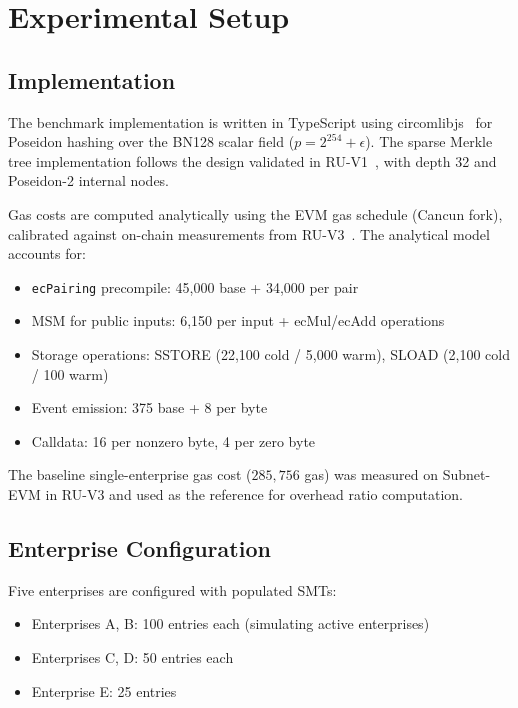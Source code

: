 
\section{Experimental Setup}

\subsection{Implementation}

The benchmark implementation is written in TypeScript using
circomlibjs~\cite{circomlibjs2024} for Poseidon hashing over the BN128 scalar
field ($p = 2^{254} + \epsilon$). The sparse Merkle tree implementation follows
the design validated in RU-V1~\cite{ruv1smt}, with depth 32 and Poseidon-2
internal nodes.

Gas costs are computed analytically using the EVM gas schedule (Cancun fork),
calibrated against on-chain measurements from RU-V3~\cite{ruv3gas}. The
analytical model accounts for:
\begin{itemize}
\item \texttt{ecPairing} precompile: 45,000 base + 34,000 per pair
\item MSM for public inputs: 6,150 per input + ecMul/ecAdd operations
\item Storage operations: SSTORE (22,100 cold / 5,000 warm), SLOAD (2,100
  cold / 100 warm)
\item Event emission: 375 base + 8 per byte
\item Calldata: 16 per nonzero byte, 4 per zero byte
\end{itemize}

The baseline single-enterprise gas cost ($285{,}756$ gas) was measured on
Subnet-EVM in RU-V3 and used as the reference for overhead ratio computation.

\subsection{Enterprise Configuration}

Five enterprises are configured with populated SMTs:
\begin{itemize}
\item Enterprises A, B: 100 entries each (simulating active enterprises)
\item Enterprises C, D: 50 entries each
\item Enterprise E: 25 entries
\end{itemize}

